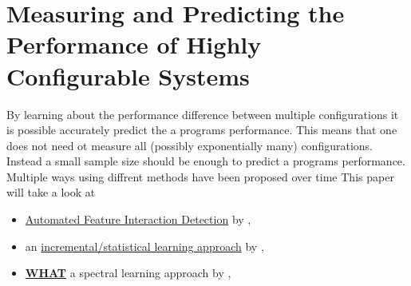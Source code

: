 \section{Measuring and Predicting the Performance of Highly Configurable Systems}\label{sec:measuring}

By learning about the performance difference between multiple configurations it is possible accurately predict the a programs performance. This means that one does not need ot measure all (possibly exponentially many) configurations. Instead a small sample size should be enough to predict a programs performance. Multiple ways using diffrent methods have been proposed over time \cite{FasterDiscoveryofFasterSystemConfigurationsSiegmund2017} This paper will take a look at
\begin{itemize}
	\item \hyperref[sec:AFID]{Automated Feature Interaction Detection} by \citet{AutomatedFeatureDetectionSiegmund2012},
	\item an \hyperref[sec:IncrementalApproach]{incremental/statistical learning approach} by \citet{VariabilityAwarePerformancePredictionJianmeiSigmundApel},
	\item \hyperref[sec:WHAT]{\textbf{WHAT}} a spectral learning approach by \citet{FasterDiscoveryofFasterSystemConfigurationsSiegmund2017},
\end{itemize}












